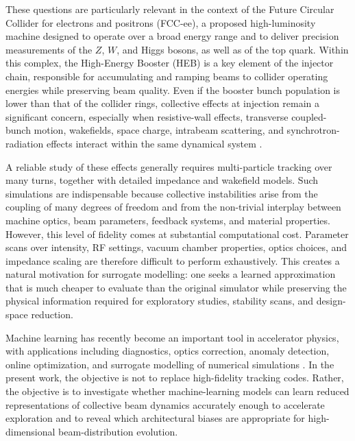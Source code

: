 \documentclass[11pt,a4paper]{article}
\begin{document}
\begin{sloppypar}
These questions are particularly relevant in the context of the Future Circular Collider for electrons and positrons (FCC-ee), a proposed high-luminosity machine designed to operate over a broad energy range and to deliver precision measurements of the $Z$, $W$, and Higgs bosons, as well as of the top quark. Within this complex, the High-Energy Booster (HEB) is a key element of the injector chain, responsible for accumulating and ramping beams to collider operating energies while preserving beam quality. Even if the booster bunch population is lower than that of the collider rings, collective effects at injection remain a significant concern, especially when resistive-wall effects, transverse coupled-bunch motion, wakefields, space charge, intrabeam scattering, and synchrotron-radiation effects interact within the same dynamical system \cite{gibellieri_impact_fcc_heb}.

A reliable study of these effects generally requires multi-particle tracking over many turns, together with detailed impedance and wakefield models. Such simulations are indispensable because collective instabilities arise from the coupling of many degrees of freedom and from the non-trivial interplay between machine optics, beam parameters, feedback systems, and material properties. However, this level of fidelity comes at substantial computational cost. Parameter scans over intensity, RF settings, vacuum chamber properties, optics choices, and impedance scaling are therefore difficult to perform exhaustively. This creates a natural motivation for surrogate modelling: one seeks a learned approximation that is much cheaper to evaluate than the original simulator while preserving the physical information required for exploratory studies, stability scans, and design-space reduction.

Machine learning has recently become an important tool in accelerator physics, with applications including diagnostics, optics correction, anomaly detection, online optimization, and surrogate modelling of numerical simulations \cite{arpaia_machine_2021,roussel_bayesian_2024}. In the present work, the objective is not to replace high-fidelity tracking codes. Rather, the objective is to investigate whether machine-learning models can learn reduced representations of collective beam dynamics accurately enough to accelerate exploration and to reveal which architectural biases are appropriate for high-dimensional beam-distribution evolution.


\end{sloppypar}
\end{document}
